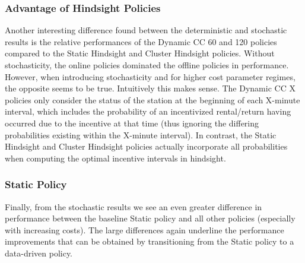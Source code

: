 \subsubsection{Advantage of Hindsight Policies}

Another interesting difference found between the deterministic and stochastic results is the relative performances of the Dynamic CC 60 and 120 policies compared to the Static Hindsight and Cluster Hindsight policies. Without stochasticity, the online policies dominated the offline policies in performance. However, when introducing stochasticity and for higher cost parameter regimes, the opposite seems to be true.  Intuitively this makes sense. The Dynamic CC X policies only consider the status of the station at the beginning of each X-minute interval, which includes the probability of an incentivized rental/return having occurred due to the incentive at that time (thus ignoring the differing probabilities existing within the X-minute interval). In contrast, the Static Hindsight and Cluster Hindsight policies actually incorporate all probabilities when computing the optimal incentive intervals in hindsight. 

\subsubsection{Static Policy}

Finally, from the stochastic results we see an even greater difference in performance between the baseline Static policy and all other policies (especially with increasing costs). The large differences again underline the performance improvements that can be obtained by transitioning from the Static policy to a data-driven policy.
  



